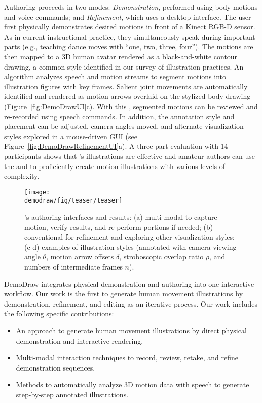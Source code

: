 Authoring proceeds in two modes: {\em Demonstration}, performed using body motions and voice commands; and {\em Refinement}, which uses a desktop interface.
%
The user first physically demonstrates desired motions in front of a Kinect RGB-D sensor. As in current instructional practice, they simultaneously speak during important parts (e.g., teaching dance moves with ``one, two, three, four'').
The motions are then mapped to a 3D human avatar rendered as a black-and-white contour drawing, a common style identified in our survey of illustration practices.
%
An algorithm analyzes speech and motion streams to segment motions into illustration figures with key frames. Salient joint movements are automatically identified and rendered as motion arrows overlaid on the stylized body drawing (Figure~\ref{fig:DemoDrawUI}c).
%
With this {\em \phaseI{}}, segmented motions can be reviewed and re-recorded using speech commands.
In addition, the annotation style and placement can be adjusted, camera angles moved, and alternate visualization styles explored in a mouse-driven GUI \emph{\phaseII{}} (see Figure~\ref{fig:DemoDrawRefinementUI}a).
%
A three-part evaluation with 14 participants shows that \systemname{}'s illustrations are effective and amateur authors can use the \phaseI{} and \phaseII{} to proficiently create motion illustrations with various levels of complexity.

\begin{figure*}[t!]
  \centering
  \texttt{[image: \\demodraw/fig/teaser/teaser]}
  \caption{\systemname{}'s authoring interfaces and results: (a) multi-modal \textit{\phaseI{}} to capture motion, verify results, and re-perform portions if needed; (b) conventional \textit{\phaseII{}} for refinement and exploring other visualization styles; (c-d) examples of illustration styles (annotated with camera viewing angle $\theta$, motion arrow offsets $\delta$, stroboscopic overlap ratio $\rho$, and numbers of intermediate frames $n$).}
  \label{fig:demodraw_teaser}
\end{figure*}

DemoDraw integrates physical demonstration and authoring into one interactive workflow. Our work is the first to generate human movement illustrations by demonstration, refinement, and editing as an iterative process. %
Our work includes the following specific contributions:

\begin{itemize}
  \item An approach to generate human movement illustrations by direct physical demonstration and interactive rendering.
  \item Multi-modal interaction techniques to record, review, retake, and refine demonstration sequences.
  \item Methods to automatically analyze 3D motion data with speech to generate step-by-step annotated illustrations.
\end{itemize}
